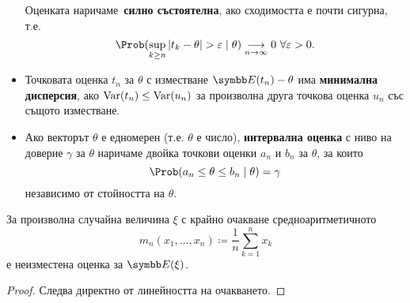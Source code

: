 \documentclass[numbers=endperiod, bibliography=totocnumbered]{scrartcl}
\begin{document}
\begin{definition}[Оценки]
\begin{itemize}
    Оценката наричаме~\textbf{силно състоятелна}, ако сходимостта е почти сигурна, т.е.
    \begin{equation*}
      \Prob(\sup_{k \geq n} \Abs{t_k - \theta} > \varepsilon \mid \theta) \Conv[n \to \infty]{} 0~\forall \varepsilon > 0.
    \end{equation*}

    \item Точковата оценка \( t_n \) за \( \theta \) с изместване \( \Expect(t_n) - \theta \) има \textbf{минимална дисперсия}, ако \( \operatorname{Var}(t_n) \leq \operatorname{Var}(u_n) \) за произволна друга точкова оценка \( u_n \) със същото изместване.

    \item Ако векторът \( \theta \) е едномерен (т.е. \( \theta \) е число), \textbf{интервална оценка} с ниво на доверие \( \gamma \) за \( \theta \) наричаме двойка точкови оценки \( a_n \) и \( b_n \) за \( \theta \), за които
    \begin{equation*}
      \Prob(a_n \leq \theta \leq b_n \mid \theta) = \gamma
    \end{equation*}
    независимо от стойността на \( \theta \).
  \end{itemize}
\end{definition}

\begin{proposition}\label{thm:mean_is_unbiased_estimator}
  За произволна случайна величина \( \xi \) с крайно очакване средноаритметичното
  \begin{equation*}
    m_n(x_1, \ldots, x_n) \coloneqq \frac 1 n \sum_{k=1}^n x_k
  \end{equation*}
  е неизместена оценка за \( \Expect(\xi) \).
\end{proposition}
\begin{proof}
  Следва директно от линейността на очакването.
\end{proof}
\end{document}
